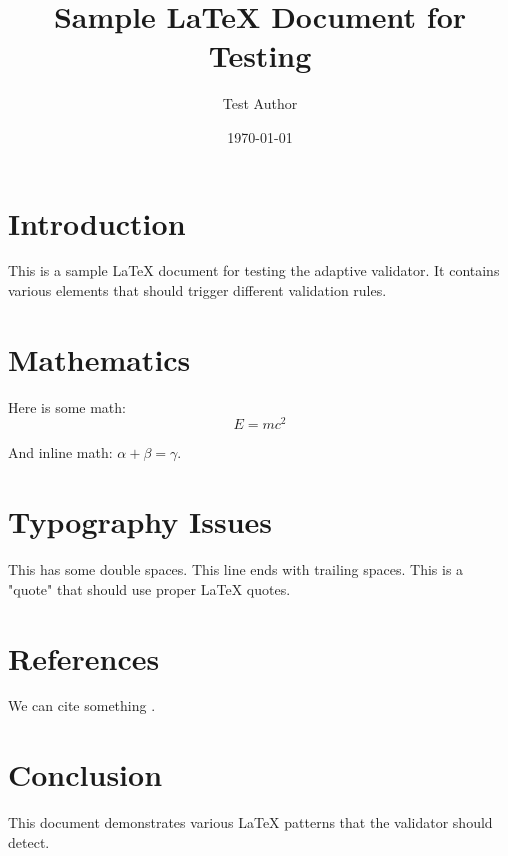 \documentclass{article}
\begin{document}
\title{Sample LaTeX Document for Testing}
\author{Test Author}
\date{\today}
\maketitle

\section{Introduction}
This is a sample LaTeX document for testing the adaptive validator. It contains various elements that should trigger different validation rules.

\section{Mathematics}
Here is some math:
\begin{equation}
E = mc^2
\end{equation}

And inline math: $\alpha + \beta = \gamma$.

\section{Typography Issues}
This has some  double spaces.
This line ends with trailing spaces.   
This is a "quote" that should use proper LaTeX quotes.

\section{References}
We can cite something \cite{nonexistent}.

\section{Conclusion}
This document demonstrates various LaTeX patterns that the validator should detect.
\end{document}
